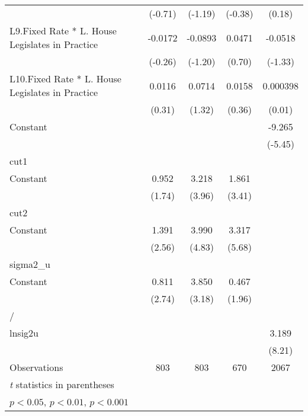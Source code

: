 {\begin{longtable}{l*{4}{c}}
                &  (-0.71)         &  (-1.19)         &  (-0.38)         &   (0.18)         \\
[1em]
L9.Fixed Rate * L. House Legislates in Practice&  -0.0172         &  -0.0893         &   0.0471         &  -0.0518         \\
                &  (-0.26)         &  (-1.20)         &   (0.70)         &  (-1.33)         \\
[1em]
L10.Fixed Rate * L. House Legislates in Practice&   0.0116         &   0.0714         &   0.0158         & 0.000398         \\
                &   (0.31)         &   (1.32)         &   (0.36)         &   (0.01)         \\
[1em]
Constant        &                  &                  &                  &   -9.265\sym{***}\\
                &                  &                  &                  &  (-5.45)         \\
\hline
cut1            &                  &                  &                  &                  \\
Constant        &    0.952         &    3.218\sym{***}&    1.861\sym{***}&                  \\
                &   (1.74)         &   (3.96)         &   (3.41)         &                  \\
\hline
cut2            &                  &                  &                  &                  \\
Constant        &    1.391\sym{*}  &    3.990\sym{***}&    3.317\sym{***}&                  \\
                &   (2.56)         &   (4.83)         &   (5.68)         &                  \\
\hline
sigma2\_u        &                  &                  &                  &                  \\
Constant        &    0.811\sym{**} &    3.850\sym{**} &    0.467         &                  \\
                &   (2.74)         &   (3.18)         &   (1.96)         &                  \\
\hline
/               &                  &                  &                  &                  \\
lnsig2u         &                  &                  &                  &    3.189\sym{***}\\
                &                  &                  &                  &   (8.21)         \\
\hline
Observations    &      803         &      803         &      670         &     2067         \\
\hline\hline
\multicolumn{5}{l}{\footnotesize \textit{t} statistics in parentheses}\\
\multicolumn{5}{l}{\footnotesize \sym{*} \(p<0.05\), \sym{**} \(p<0.01\), \sym{***} \(p<0.001\)}\\
\end{longtable}
}
